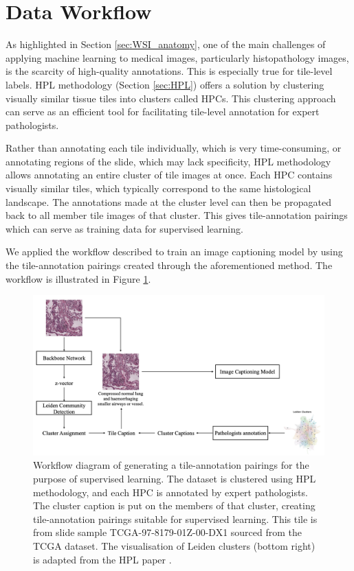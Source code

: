 \documentclass{l4proj}
\begin{document}
\section{Data Workflow} \label{sec:data-workflow}
As highlighted in Section \ref{sec:WSI_anatomy}, one of the main challenges of applying machine learning to medical images, particularly histopathology images, is the scarcity of high-quality annotations. This is especially true for tile-level labels. HPL methodology (Section \ref{sec:HPL}) offers a solution by clustering visually similar tissue tiles into clusters called HPCs. This clustering approach can serve as an efficient tool for facilitating tile-level annotation for expert pathologists.

Rather than annotating each tile individually, which is very time-consuming, or annotating regions of the slide, which may lack specificity, HPL methodology allows annotating an entire cluster of tile images at once. Each HPC contains visually similar tiles, which typically correspond to the same histological landscape. The annotations made at the cluster level can then be propagated back to all member tile images of that cluster. This gives tile-annotation pairings which can serve as training data for supervised learning.

We applied the workflow described to train an image captioning model by using the tile-annotation pairings created through the aforementioned method. The workflow is illustrated in Figure \ref{fig:data-workflow}. 

\begin{figure}[h]
    \centering
    \includegraphics[width=1\linewidth]{images/workflow_diagram.png}
    \caption{Workflow diagram of generating a tile-annotation pairings for the purpose of supervised learning. The dataset is clustered using HPL methodology, and each HPC is annotated by expert pathologists. The cluster caption is put on the members of that cluster, creating tile-annotation pairings suitable for supervised learning. This tile is from slide sample TCGA-97-8179-01Z-00-DX1 sourced from the TCGA dataset. The visualisation of Leiden clusters (bottom right) is adapted from the HPL paper \citep{ClaudioQuiros2024}.}
    \label{fig:data-workflow}
\end{figure}
\end{document}
